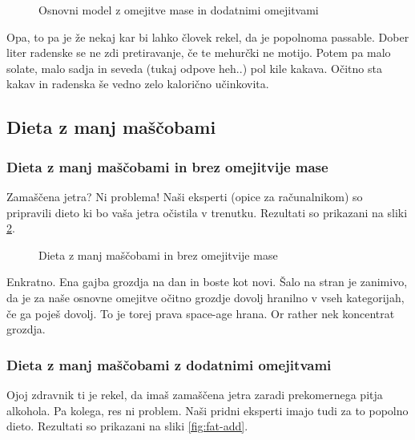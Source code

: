 \documentclass[a4paper]{article}
\begin{document}
\begin{figure}[H]
    \centering
    \caption{Osnovni model z omejitve mase in dodatnimi omejitvami}
    \label{fig:basic-add}
\end{figure}

Opa, to pa je že nekaj kar bi lahko človek rekel, da je popolnoma passable. Dober liter radenske se ne zdi
pretiravanje, če te mehurčki ne motijo. Potem pa malo solate, malo sadja in seveda (tukaj odpove heh..) pol kile 
kakava. Očitno sta kakav in radenska še vedno zelo kalorično učinkovita.

\newpage
\subsection{Dieta z manj maščobami}
\subsubsection{Dieta z manj maščobami in brez omejitvije mase}
Zamaščena jetra? Ni problema! Naši eksperti (opice za računalnikom) so pripravili dieto
ki bo vaša jetra očistila v trenutku. Rezultati so prikazani na sliki \ref{fig:fat-no-mass}. \\

\begin{figure}[H]
    \centering
    \caption{Dieta z manj maščobami in brez omejitvije mase}
    \label{fig:fat-no-mass}
\end{figure}

Enkratno. Ena gajba grozdja na dan in boste kot novi. Šalo na stran je zanimivo, da je za naše
osnovne omejitve očitno grozdje dovolj hranilno v vseh kategorijah, če ga poješ dovolj. To je torej
prava space-age hrana. Or rather nek koncentrat grozdja. \\

\newpage
\subsubsection{Dieta z manj maščobami z dodatnimi omejitvami}
Ojoj zdravnik ti je rekel, da imaš zamaščena jetra zaradi prekomernega pitja alkohola. Pa kolega, 
res ni problem. Naši pridni eksperti imajo tudi za to popolno dieto. Rezultati so prikazani na
sliki \ref{fig:fat-add}. \\
\end{document}

